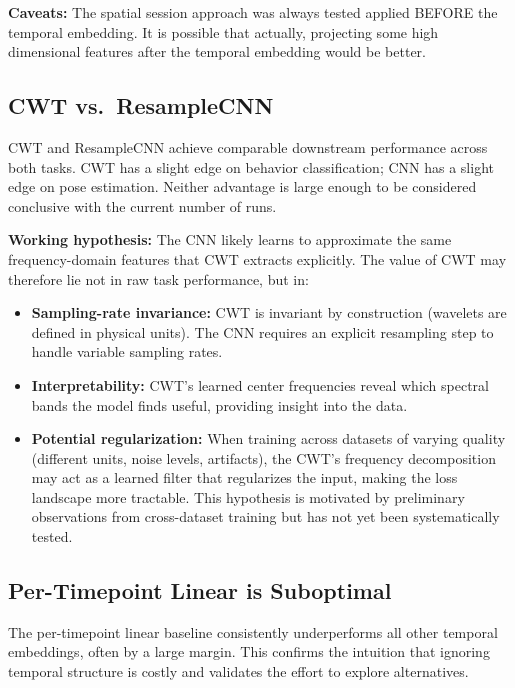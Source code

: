 \documentclass[11pt, a4paper]{article}
\begin{document}
\textbf{Caveats:} The spatial session approach was always tested applied BEFORE
the temporal embedding. It is possible that actually, projecting some high dimensional
features after the temporal embedding would be better.

\subsection{CWT vs.\ ResampleCNN}

CWT and ResampleCNN achieve comparable downstream performance across
both tasks. CWT has a slight edge on behavior classification; CNN has
a slight edge on pose estimation. Neither advantage is large enough to
be considered conclusive with the current number of runs.

\textbf{Working hypothesis:} The CNN likely learns to approximate the
same frequency-domain features that CWT extracts explicitly. The value
of CWT may therefore lie not in raw task performance, but in:
\begin{itemize}[nosep]
      \item \textbf{Sampling-rate invariance:} CWT is invariant by
            construction (wavelets are defined in physical units). The CNN
            requires an explicit resampling step to handle variable
            sampling rates.
      \item \textbf{Interpretability:} CWT's learned center frequencies
            reveal which spectral bands the model finds useful, providing
            insight into the data.
      \item \textbf{Potential regularization:} When training across
            datasets of varying quality (different units, noise levels,
            artifacts), the CWT's frequency decomposition may act as a
            learned filter that regularizes the input, making the loss
            landscape more tractable. This hypothesis is motivated by
            preliminary observations from cross-dataset training but
            has not yet been systematically tested.
\end{itemize}

\subsection{Per-Timepoint Linear is Suboptimal}

The per-timepoint linear baseline consistently underperforms all other
temporal embeddings, often by a large margin. This confirms the
intuition that ignoring temporal structure is costly and validates the
effort to explore alternatives.
\end{document}
